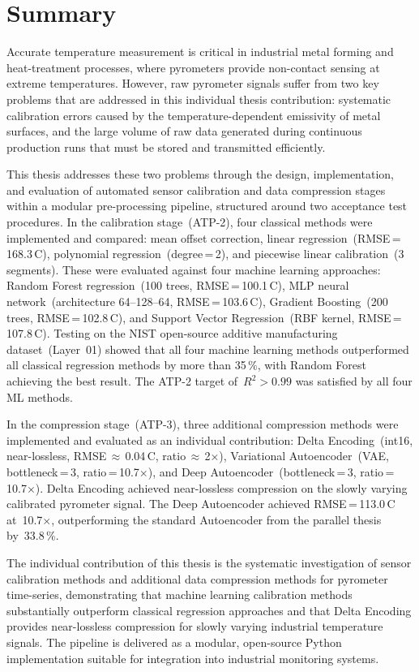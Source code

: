 \section*{Summary}
\vspace{-2ex}\titlerule\vspace{4ex}

Accurate temperature measurement is critical in industrial metal forming and heat-treatment processes, where pyrometers provide non-contact sensing at extreme temperatures. However, raw pyrometer signals suffer from two key problems that are addressed in this individual thesis contribution: systematic calibration errors caused by the temperature-dependent emissivity of metal surfaces, and the large volume of raw data generated during continuous production runs that must be stored and transmitted efficiently.

This thesis addresses these two problems through the design, implementation, and evaluation of automated sensor calibration and data compression stages within a modular pre-processing pipeline, structured around two acceptance test procedures. In the calibration stage~(ATP-2), four classical methods were implemented and compared: mean offset correction, linear regression~(RMSE\,=\,168.3\,\textdegree C), polynomial regression~(degree\,=\,2), and piecewise linear calibration~(3 segments). These were evaluated against four machine learning approaches: Random Forest regression~(100 trees, RMSE\,=\,100.1\,\textdegree C), MLP neural network~(architecture 64--128--64, RMSE\,=\,103.6\,\textdegree C), Gradient Boosting~(200 trees, RMSE\,=\,102.8\,\textdegree C), and Support Vector Regression~(RBF kernel, RMSE\,=\,107.8\,\textdegree C). Testing on the NIST open-source additive manufacturing dataset~(Layer~01) showed that all four machine learning methods outperformed all classical regression methods by more than 35\,\%, with Random Forest achieving the best result. The ATP-2 target of~$R^2 > 0.99$ was satisfied by all four ML methods.

In the compression stage~(ATP-3), three additional compression methods were implemented and evaluated as an individual contribution: Delta Encoding~(int16, near-lossless, RMSE\,$\approx$\,0.04\,\textdegree C, ratio\,$\approx$\,2$\times$), Variational Autoencoder~(VAE, bottleneck\,=\,3, ratio\,=\,10.7$\times$), and Deep Autoencoder~(bottleneck\,=\,3, ratio\,=\,10.7$\times$). Delta Encoding achieved near-lossless compression on the slowly varying calibrated pyrometer signal. The Deep Autoencoder achieved RMSE\,=\,113.0\,\textdegree C at~10.7$\times$, outperforming the standard Autoencoder from the parallel thesis by~33.8\,\%.

The individual contribution of this thesis is the systematic investigation of sensor calibration methods and additional data compression methods for pyrometer time-series, demonstrating that machine learning calibration methods substantially outperform classical regression approaches and that Delta Encoding provides near-lossless compression for slowly varying industrial temperature signals. The pipeline is delivered as a modular, open-source Python implementation suitable for integration into industrial monitoring systems.
